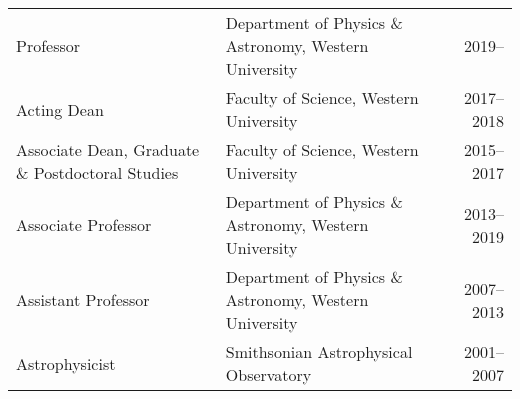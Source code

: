 
\begin{tabularx}{\textwidth}{p{5cm}Xr}
Professor & Department of Physics \& Astronomy, Western University & 2019--\\
Acting Dean & Faculty of Science, Western University & 2017--2018 \\
Associate Dean, Graduate \& Postdoctoral Studies & Faculty of Science, Western University & 2015--2017 \\
Associate Professor & Department of Physics \& Astronomy, Western University & 2013--2019\\
Assistant Professor& Department of Physics \& Astronomy, Western University&2007--2013  \\
 Astrophysicist & Smithsonian Astrophysical Observatory & 2001--2007\\
\end{tabularx}

